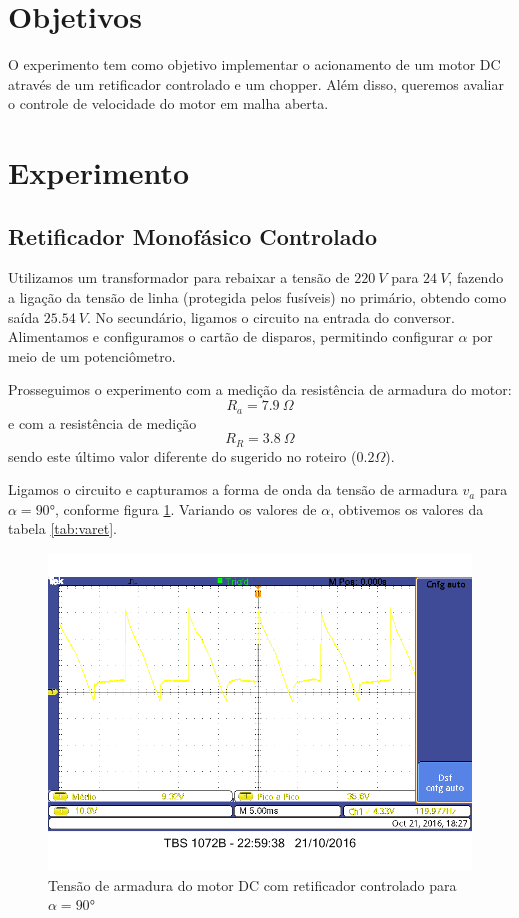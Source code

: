 \documentclass{article}
\begin{document}


\onehalfspacing
\section{Objetivos}
	O experimento tem como objetivo implementar o acionamento de um motor DC através de um retificador controlado e um chopper. Além disso, queremos avaliar o controle de velocidade do motor em malha aberta.
	 
\section{Experimento}
\subsection{Retificador Monofásico Controlado}
Utilizamos um transformador para rebaixar a tensão de $220\ V$ para $24\ V$, fazendo a ligação da tensão de linha (protegida pelos fusíveis) no primário, obtendo como saída $25.54\ V$. No secundário, ligamos o circuito na entrada do conversor. Alimentamos e configuramos o cartão de disparos, permitindo configurar $\alpha$ por meio de um potenciômetro.


Prosseguimos o experimento com a medição da resistência de armadura do motor:
\begin{equation}
R_a=7.9\ \Omega
\end{equation}
e com a resistência de medição 
\begin{equation}
R_R=3.8\ \Omega
\end{equation}
sendo este último valor diferente do sugerido no roteiro ($0.2\Omega$).

Ligamos o circuito e capturamos a forma de onda da tensão de armadura $v_a$ para $\alpha=90°$, conforme figura \ref{fig:varet}. Variando os valores de $\alpha$, obtivemos os valores da tabela \ref{tab:varet}.

\begin{figure}[H]
	\centering
	\includegraphics[width=\linewidth]{Dados/Retificador/1.bmp}
	\caption{Tensão de armadura do motor DC com retificador controlado para $\alpha=90°$}
	\label{fig:varet}
\end{figure}
\end{document}
